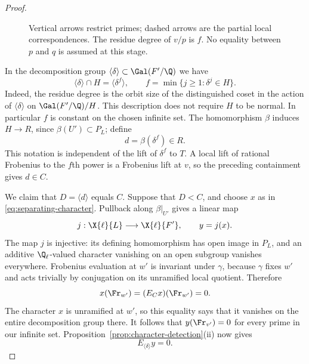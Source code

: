 \begin{proof}
\begin{figure}[htbp]
\centering
{}
\caption{Vertical arrows restrict primes; dashed arrows are the
partial local correspondences. The residue degree of $v/p$ is $f$.
No equality between $p$ and $q$ is assumed at this stage.}
\label{fig:generation-primes}
\end{figure}

In the decomposition group
$\langle\delta\rangle\subset\Gal(F'/\Q)$ we have
\begin{equation}\label{eq:residue-degree-intersection}
 \langle\delta\rangle\cap H=\langle\delta^f\rangle,
 \qquad
 f=\min\{j\geq1:\delta^j\in H\}.
\end{equation}
Indeed, the residue degree is the orbit size of the distinguished
coset in the action of $\langle\delta\rangle$ on
$\Gal(F'/\Q)/H$. This description does not require $H$ to be
normal. In particular $f$ is constant on the chosen infinite set.
The homomorphism $\beta$ induces $H\to R$, since
$\beta(U')\subset P_L$; define
\[
 d=\beta(\delta^f)\in R.
\]
This notation is independent of the lift of $\delta^f$ to $T$.
A local lift of rational Frobenius to the $f$th power is a
Frobenius lift at $v$, so the preceding containment gives $d\in C$.

We claim that $D=\langle d\rangle$ equals $C$. Suppose that $D<C$,
and choose $x$ as in \eqref{eq:separating-character}. Pullback along
$\beta|_{U'}$ gives a linear map
\[
 j:\X{\ell}{L}\longrightarrow\X{\ell}{F'},\qquad y=j(x).
\]
The map $j$ is injective: its defining homomorphism has open image
in $P_L$, and an additive $\Q_\ell$-valued character vanishing on
an open subgroup vanishes everywhere. Frobenius evaluation at $w'$
is invariant under $\gamma$, because $\gamma$ fixes $w'$ and acts
trivially by conjugation on its unramified local quotient. Therefore
\[
 x(\Fr_{w'})=(E_Cx)(\Fr_{w'})=0.
\]
The character $x$ is unramified at $w'$, so this equality says that
it vanishes on the entire decomposition group there. It follows
that $y(\Fr_{v'})=0$ for every prime in our infinite set.
Proposition~\ref{prop:character-detection}(ii) now gives
\begin{equation}\label{eq:source-average-zero}
 E_{\langle\delta\rangle}y=0.
\end{equation}


\end{proof}
